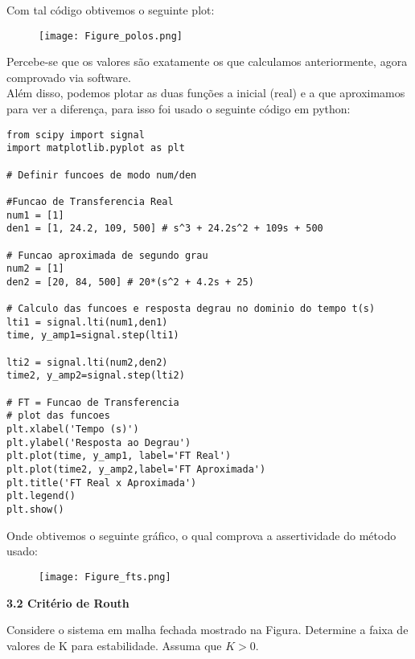 Com tal código obtivemos o seguinte plot:

\begin{figure}[H]
  \centering
  \texttt{[image: Figure\_polos.png]}
\end{figure}

Percebe-se  que os valores são exatamente os que calculamos anteriormente, agora comprovado via software. \\

Além disso, podemos plotar as duas funções a inicial (real) e a que aproximamos para ver a diferença, para isso foi usado o seguinte código em python: \vspace{30pt}


\begin{lstlisting}
from scipy import signal
import matplotlib.pyplot as plt

# Definir funcoes de modo num/den

#Funcao de Transferencia Real
num1 = [1]
den1 = [1, 24.2, 109, 500] # s^3 + 24.2s^2 + 109s + 500

# Funcao aproximada de segundo grau
num2 = [1]
den2 = [20, 84, 500] # 20*(s^2 + 4.2s + 25)

# Calculo das funcoes e resposta degrau no dominio do tempo t(s)
lti1 = signal.lti(num1,den1)
time, y_amp1=signal.step(lti1)

lti2 = signal.lti(num2,den2)
time2, y_amp2=signal.step(lti2)

# FT = Funcao de Transferencia
# plot das funcoes
plt.xlabel('Tempo (s)')
plt.ylabel('Resposta ao Degrau')
plt.plot(time, y_amp1, label='FT Real')
plt.plot(time2, y_amp2,label='FT Aproximada')
plt.title('FT Real x Aproximada')
plt.legend()
plt.show()
\end{lstlisting}
\vspace{30pt}

Onde obtivemos o seguinte gráfico, o qual comprova a assertividade do método usado:
\begin{figure}[H]
  \centering
  \texttt{[image: Figure\_fts.png]}
\end{figure}



\begin{flushleft}
	 \textcolor{myBlue}{\textbf{\large{3.2 Critério de Routh }}}
\end{flushleft}
Considere o sistema em malha fechada mostrado na Figura.
Determine a faixa de valores de K para estabilidade. Assuma que \(K > 0\).

